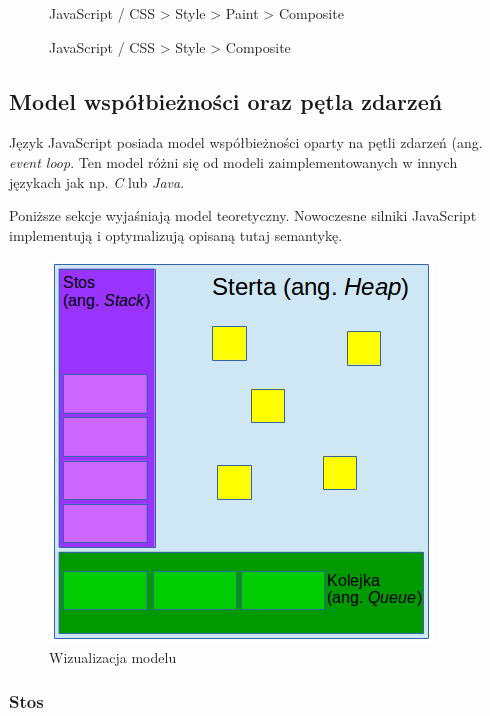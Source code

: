 \documentclass[polish, twoside, 12pt]{mwart}
\begin{document}
\begin{figure}[ht]
	\caption{JavaScript / CSS > Style > Paint > Composite}
\end{figure}

\begin{figure}[ht]
	\caption{JavaScript / CSS > Style > Composite}
\end{figure}

\subsection{Model współbieżności oraz pętla zdarzeń}

Język JavaScript posiada model współbieżności oparty na pętli zdarzeń (ang. \emph{event loop}. Ten model różni się od modeli zaimplementowanych w innych językach jak np. \emph{C} lub \emph{Java}.

Poniższe sekcje wyjaśniają model teoretyczny. Nowoczesne silniki JavaScript implementują i optymalizują opisaną tutaj semantykę.

\begin{figure}[ht]
  \includegraphics[width=\textwidth]{concurrency-model.png}
	\caption{Wizualizacja modelu}
\end{figure}

\subsubsection{Stos}
\end{document}
